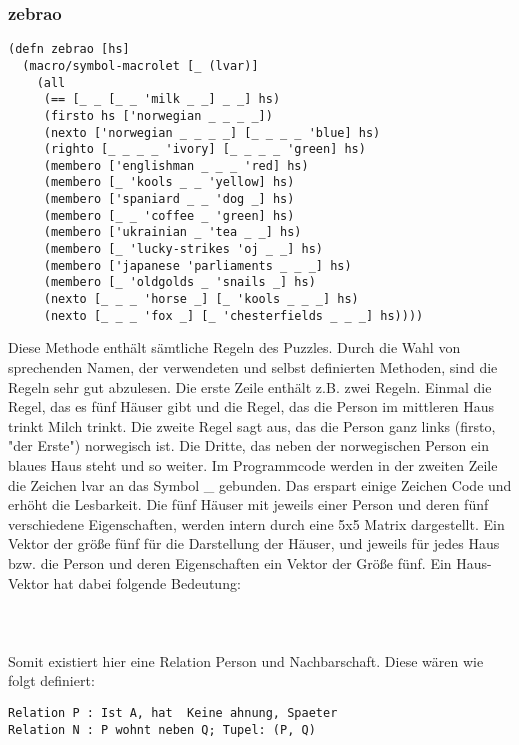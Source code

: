 \subsubsection{zebrao}

\begin{lstlisting}
(defn zebrao [hs]
  (macro/symbol-macrolet [_ (lvar)]
    (all
     (== [_ _ [_ _ 'milk _ _] _ _] hs)
     (firsto hs ['norwegian _ _ _ _])
     (nexto ['norwegian _ _ _ _] [_ _ _ _ 'blue] hs)
     (righto [_ _ _ _ 'ivory] [_ _ _ _ 'green] hs)
     (membero ['englishman _ _ _ 'red] hs)
     (membero [_ 'kools _ _ 'yellow] hs)
     (membero ['spaniard _ _ 'dog _] hs)
     (membero [_ _ 'coffee _ 'green] hs)
     (membero ['ukrainian _ 'tea _ _] hs)
     (membero [_ 'lucky-strikes 'oj _ _] hs)
     (membero ['japanese 'parliaments _ _ _] hs)
     (membero [_ 'oldgolds _ 'snails _] hs)
     (nexto [_ _ _ 'horse _] [_ 'kools _ _ _] hs)
     (nexto [_ _ _ 'fox _] [_ 'chesterfields _ _ _] hs))))
\end{lstlisting}
Diese Methode enthält sämtliche Regeln des Puzzles. Durch die Wahl von sprechenden Namen, der verwendeten und selbst definierten Methoden, sind die Regeln sehr gut abzulesen. Die erste Zeile enthält z.B. zwei Regeln. Einmal die Regel, das es fünf Häuser gibt und die Regel, das die Person im mittleren Haus trinkt Milch trinkt. Die zweite Regel sagt aus, das die Person ganz links (firsto, "der Erste") norwegisch ist. Die Dritte, das neben der norwegischen Person ein blaues Haus steht und so weiter.
Im Programmcode werden in der zweiten Zeile die Zeichen \dq{}lvar\dq{} an das Symbol \dq{}\_\dq{} gebunden. Das erspart einige Zeichen Code und erhöht die Lesbarkeit. 
Die fünf Häuser mit jeweils einer Person und deren fünf verschiedene Eigenschaften, werden intern durch eine 5x5 Matrix dargestellt. Ein Vektor der größe fünf für die Darstellung der Häuser, und jeweils für jedes Haus bzw. die Person und deren Eigenschaften ein Vektor der Größe fünf. Ein \dq{}Haus-Vektor\dq{} hat dabei folgende Bedeutung:
\\
\\
\\
\\
Somit existiert hier eine Relation \dq{}Person\dq{} und \dq{}Nachbarschaft\dq{}. Diese wären wie folgt definiert:
\begin{lstlisting}
Relation P : Ist A, hat  Keine ahnung, Spaeter 
Relation N : P wohnt neben Q; Tupel: (P, Q)
\end{lstlisting}

